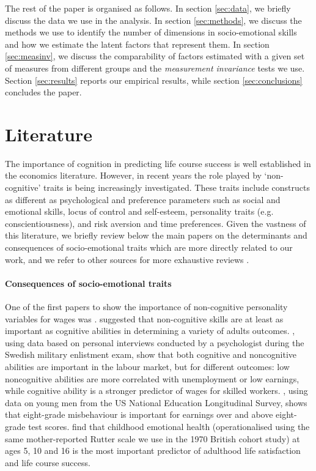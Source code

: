 The rest of the paper is organised as follows. In section \ref{sec:data}, we briefly discuss the data we use in the analysis. In section \ref{sec:methods}, we discuss the methods we use to identify the number of dimensions in socio-emotional skills and how we estimate the latent factors that represent them. In section \ref{sec:measinv}, we discuss the comparability of factors estimated with a given set of measures from different groups and the \emph{measurement invariance} tests we use. Section \ref{sec:results} reports our empirical results, while section \ref{sec:conclusions} concludes the paper.


\section{Literature \label{sec:lit}}

The importance of cognition in predicting life course success is well established in the economics literature. However, in recent years the role played by `non-cognitive' traits is being increasingly investigated. These traits include constructs as different as psychological and preference parameters such as social and emotional skills, locus of control and self-esteem, personality traits (e.g. conscientiousness), and risk aversion and time preferences. Given the vastness of this literature, we briefly review below the main papers on the determinants and consequences of socio-emotional traits which are more directly related to our work, and we refer to other sources for more exhaustive reviews \citep{Borghans2008,Almlund2011,Goodman2015,Kautz2014}.

\paragraph{Consequences of socio-emotional traits} One of the first papers to show the importance of non-cognitive personality variables for wages was \cite{Bowles2001}. \cite{Heckman2006} suggested that non-cognitive skills are at least as important as cognitive abilities in determining a variety of adults outcomes. \citet{Lindqvist2011}, using data based on personal interviews conducted by a psychologist during the Swedish military enlistment exam, show that both cognitive and noncognitive abilities are important in the labour market, but for different outcomes: low noncognitive abilities are more correlated with unemployment or low earnings, while cognitive ability is a stronger predictor of wages for skilled workers. \citet{Segal2013}, using data on young men from the US National Education Longitudinal Survey, shows that eight-grade misbehaviour is important for earnings over and above eight-grade test scores. \citet{Layard2014} find that childhood emotional health (operationalised using the same mother-reported Rutter scale we use in the 1970 British cohort study) at ages 5, 10 and 16 is the most important predictor of adulthood life satisfaction and life course success.

